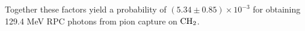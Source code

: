 Together these factors yield a probability of $ (5.34 \pm 0.85) \times 10^{-3} $
for obtaining 129.4 MeV RPC photons from pion capture on $\rm{CH_2}$.

% 




